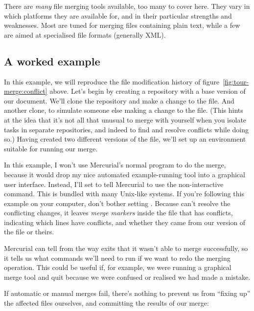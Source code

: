 There are \emph{many} file merging tools available, too many to cover
here.  They vary in which platforms they are available for, and in
their particular strengths and weaknesses.  Most are tuned for merging
files containing plain text, while a few are aimed at specialised file
formats (generally XML).

\subsection{A worked example}

In this example, we will reproduce the file modification history of
figure~\ref{fig:tour-merge:conflict} above.  Let's begin by creating a
repository with a base version of our document.
We'll clone the repository and make a change to the file.
And another clone, to simulate someone else making a change to the
file.  (This hints at the idea that it's not all that unusual to merge
with yourself when you isolate tasks in separate repositories, and
indeed to find and resolve conflicts while doing so.)
Having created two different versions of the file, we'll set up an
environment suitable for running our merge.

In this example, I won't use Mercurial's normal 
program to do the merge, because it would drop my nice automated
example-running tool into a graphical user interface.  Instead, I'll
set  to tell Mercurial to use the non-interactive
 command.  This is bundled with many Unix-like systems.
If you're following this example on your computer, don't bother
setting .
Because  can't resolve the conflicting changes, it
leaves \emph{merge markers} inside the file that has conflicts,
indicating which lines have conflicts, and whether they came from our
version of the file or theirs.

Mercurial can tell from the way  exits that it wasn't
able to merge successfully, so it tells us what commands we'll need to
run if we want to redo the merging operation.  This could be useful
if, for example, we were running a graphical merge tool and quit
because we were confused or realised we had made a mistake.

If automatic or manual merges fail, there's nothing to prevent us from
``fixing up'' the affected files ourselves, and committing the results
of our merge:

